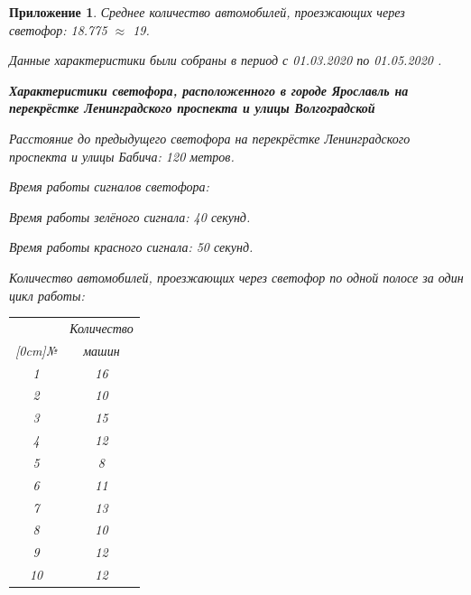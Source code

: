 \documentclass[12pt, a4paper]{extarticle}
\numberwithin{equation}{section}
\newtheorem{attachment}{\hspace{12cm}  Приложение}
\numberwithin{figure}{section}
\begin{document}
\begin{attachment}
\noindent Среднее количество автомобилей, проезжающих через светофор: 18.775 $\approx$ 19.
\newline

\noindent\textup{Данные характеристики были собраны в период с 01.03.2020 по 01.05.2020 }.
\newpage

\textup{\textbf{Характеристики светофора, расположенного в городе Ярославль на перекрёстке Ленинградского проспекта и улицы Волгоградской }}
\newline

\noindent\textup{Расстояние до предыдущего светофора на перекрёстке Ленинградского проспекта и улицы Бабича:} 120 метров.

\noindent\textup{Время работы сигналов светофора:}

Время работы зелёного сигнала: 40 секунд.

Время работы красного сигнала: 50 секунд.

\noindent\textup{Количество автомобилей, проезжающих через светофор по одной полосе за один цикл работы:}

\begin{table}[h!]
	\begin{minipage}{0.23\linewidth}
		
		\centering
		\begin{tabular}{|c|c|}
			\hline
			& Количество \\ 
			\raisebox{1.5ex}[0cm]{№}
			& машин 
			\\\hline
			1 & 16
			\\\hline
			2 & 10
			\\\hline
			3 & 15
			\\\hline
			4 & 12
			\\\hline
			5 & 8
			\\\hline
			6 & 11
			\\\hline
			7 & 13
			\\\hline
			8 & 10
			\\\hline
			9 & 12
			\\\hline
			10 & 12
			\\\hline
		\end{tabular}
	\end{minipage}
	\begin{minipage}{0.23\linewidth}
		\centering
		

\end{minipage}
\end{table}
\end{attachment}
\end{document}
